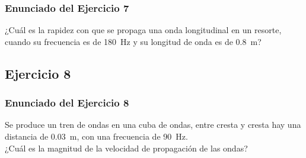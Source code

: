 \documentclass[14pt]{beamer}
\begin{document}
\begin{frame}
\frametitle{Enunciado del Ejercicio 7}
¿Cuál es la rapidez con que se propaga una onda longitudinal en un resorte, cuando su frecuencia es de \SI{180}{\hertz} y su longitud de onda es de \SI{0.8}{\meter}?
\end{frame}

\subsection{Ejercicio 8}

\begin{frame}
\frametitle{Enunciado del Ejercicio 8}
Se produce un tren de ondas en una cuba de ondas, entre cresta y cresta hay una distancia de \SI{0.03}{\meter}, con una frecuencia de \SI{90}{\hertz}.
\\
\bigskip
\pause
¿Cuál es la magnitud de la velocidad de propagación de las ondas?
\end{frame}
\end{document}
